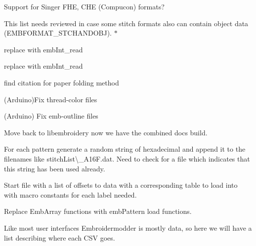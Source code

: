 \begin{DoxyRefList}
\label{todo__todo000191}%
%
Support for Singer FHE, CHE (Compucon) formats? 
\item[Member \mbox{\hyperlink{formats_8c_a8cb11404ce46501561f956d33f8dcf95}{format\+Table}} \mbox{[}number\+Of\+Formats\mbox{]}]\label{todo__todo000216}%
%
This list needs reviewed in case some stitch formats also can contain object data (EMBFORMAT\+\_\+\+STCHANDOBJ). $\ast$  
\item[Member \mbox{\hyperlink{formats_8c_a05fb50e7292226bc2947dd2b4da7a9bd}{fread\+\_\+int32\+\_\+be}} (FILE $\ast$f)]\label{todo__todo000218}%
%
replace with emb\+Int\+\_\+read  
\item[Member \mbox{\hyperlink{formats_8c_a2bcdb1e6bf6930d5c054ecdca9831eba}{fread\+\_\+uint16}} (FILE $\ast$f)]\label{todo__todo000217}%
%
replace with emb\+Int\+\_\+read  
\item[Member \mbox{\hyperlink{fill_8c_ad02b5d945eacff708d2bf084c40044d8}{generate\+\_\+dragon\+\_\+curve}} (char $\ast$state, int iterations)]\label{todo__todo000211}%
%
find citation for paper folding method  
\item[Page \mbox{\hyperlink{geometry-and-algorithms}{Geometry and Algorithms}} ]\label{todo__todo000193}%
%
(Arduino)Fix thread-\/color files

\label{todo__todo000192}%
%
(Arduino) Fix emb-\/outline files

\label{todo__todo000202}%
%
Move back to libembroidery now we have the combined docs build.

\label{todo__todo000201}%
%
For each pattern generate a random string of hexadecimal and append it to the filenames like {\ttfamily stitch\+List\textbackslash{}\+\_\+\+A16\+F.\+dat}. Need to check for a file which indicates that this string has been used already.

\label{todo__todo000200}%
%
Start file with a list of offsets to data with a corresponding table to load into with macro constants for each label needed.

\label{todo__todo000199}%
%
Replace Emb\+Array functions with emb\+Pattern load functions.

\label{todo__todo000198}%
%
Like most user interfaces Embroidermodder is mostly data, so here we will have a list describing where each CSV goes.


\end{DoxyRefList}
